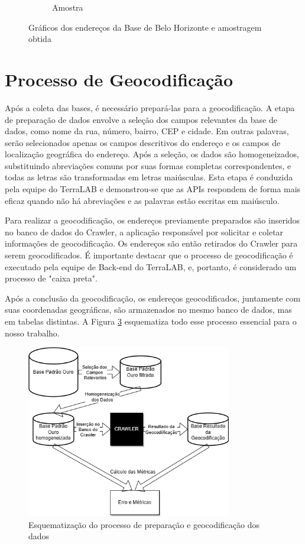 \begin{figure}[ht]
\begin{subfigure}[b]{0.45\textwidth}
      \caption{Amostra}
      \label{fig:baseBhA}
    \end{subfigure}
    \caption{Gráficos dos endereços da Base de Belo Horizonte e amostragem obtida}
    \label{fig:baseBh}
  \end{figure}

\section{Processo de Geocodificação}
\label{processoGeo}

Após a coleta das bases, é necessário prepará-las para a geocodificação. A etapa de preparação de dados envolve a seleção dos campos relevantes da base de dados, como nome da rua, número, bairro, CEP e cidade. Em outras palavras, serão selecionados apenas os campos descritivos do endereço e os campos de localização geográfica do endereço. Após a seleção, os dados são homogeneizados, substituindo abreviações comuns por suas formas completas correspondentes, e todas as letras são transformadas em letras maiúsculas. Esta etapa é conduzida pela equipe do TerraLAB e demonstrou-se que as APIs respondem de forma mais eficaz quando não há abreviações e as palavras estão escritas em maiúsculo.

Para realizar a geocodificação, os endereços previamente preparados são inseridos no banco de dados do Crawler, a aplicação responsável por solicitar e coletar informações de geocodificação. Os endereços são então retirados do Crawler para serem geocodificados. É importante destacar que o processo de geocodificação é executado pela equipe de Back-end do TerraLAB, e, portanto, é considerado um processo de "caixa preta".

Após a conclusão da geocodificação, os endereços geocodificados, juntamente com suas coordenadas geográficas, são armazenados no mesmo banco de dados, mas em tabelas distintas. A Figura \ref{fig:diagramaMono} esquematiza todo esse processo essencial para o nosso trabalho.

\begin{figure}
    \centering
    \includegraphics[width=0.8\textwidth]{Figuras/diagrama monografia.drawio.png}
    \caption{Esquematização do processo de preparação e geocodificação dos dados}
    \label{fig:diagramaMono}
\end{figure}

